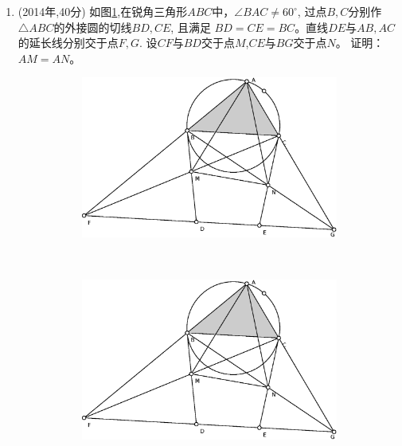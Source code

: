 \documentclass{article}
\begin{document}
\begin{enumerate}
\begin{figure}[!ht]
\begin{subfigure}[b]{0.45\textwidth}
    \caption{}
    \end{subfigure}
    \caption{}
    \end{figure}
\item (2014年,40分) 
如图\ref{fig:China2014},在锐角三角形$ABC$中，$\angle BAC \neq 60^{\circ}$, 过点$B,C$分别作$\triangle ABC$的外接圆的切线$BD,CE$, 且满足 $BD=CE=BC$。直线$DE$与$AB,AC$的延长线分别交于点$F,G$. 设$CF$与$BD$交于点$M$,$CE$与$BG$交于点$N$。 证明：$AM=AN$。

    \begin{figure}[!ht]
    \centering
    \begin{subfigure}[b]{0.45\textwidth}
    \includegraphics[width=\textwidth]{China2014.eps}
    \caption{}\label{fig:China2014}
    \end{subfigure}~
    \begin{subfigure}[b]{0.45\textwidth}
    \includegraphics[width=\textwidth]{China2014.eps}
    \caption{}
    \end{subfigure}
    \caption{}
    \end{figure}


\end{enumerate}
\end{document}
